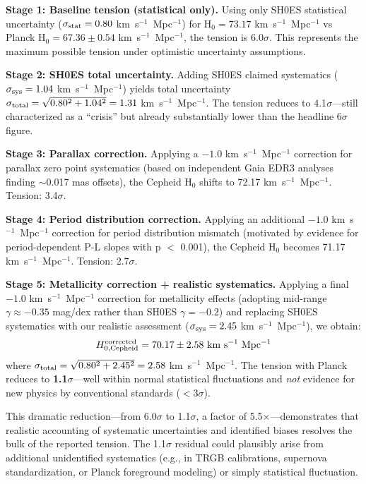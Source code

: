 \documentclass[twocolumn, linenumbers]{aastex701}
\begin{document}
\textbf{Stage 1: Baseline tension (statistical only).} Using only SH0ES statistical uncertainty ($\sigma_{\rm stat} = 0.80$ km~s$^{-1}$~Mpc$^{-1}$) for H$_0 = 73.17$ km~s$^{-1}$~Mpc$^{-1}$ vs Planck H$_0 = 67.36 \pm 0.54$ km~s$^{-1}$~Mpc$^{-1}$, the tension is 6.0$\sigma$. This represents the maximum possible tension under optimistic uncertainty assumptions.

\textbf{Stage 2: SH0ES total uncertainty.} Adding SH0ES claimed systematics ($\sigma_{\rm sys} = 1.04$ km~s$^{-1}$~Mpc$^{-1}$) yields total uncertainty $\sigma_{\rm total} = \sqrt{0.80^2 + 1.04^2} = 1.31$ km~s$^{-1}$~Mpc$^{-1}$. The tension reduces to 4.1$\sigma$---still characterized as a ``crisis'' but already substantially lower than the headline 6$\sigma$ figure.

\textbf{Stage 3: Parallax correction.} Applying a $-1.0$ km~s$^{-1}$~Mpc$^{-1}$ correction for parallax zero point systematics (based on independent Gaia EDR3 analyses finding $\sim$0.017 mas offsets), the Cepheid H$_0$ shifts to 72.17 km~s$^{-1}$~Mpc$^{-1}$. Tension: 3.4$\sigma$.

\textbf{Stage 4: Period distribution correction.} Applying an additional $-1.0$ km~s$^{-1}$~Mpc$^{-1}$ correction for period distribution mismatch (motivated by evidence for period-dependent P-L slopes with p $<$ 0.001), the Cepheid H$_0$ becomes 71.17 km~s$^{-1}$~Mpc$^{-1}$. Tension: 2.7$\sigma$.

\textbf{Stage 5: Metallicity correction + realistic systematics.} Applying a final $-1.0$ km~s$^{-1}$~Mpc$^{-1}$ correction for metallicity effects (adopting mid-range $\gamma \approx -0.35$ mag/dex rather than SH0ES $\gamma = -0.2$) and replacing SH0ES systematics with our realistic assessment ($\sigma_{\rm sys} = 2.45$ km~s$^{-1}$~Mpc$^{-1}$), we obtain:
\begin{equation}
H_{0,\rm Cepheid}^{\rm corrected} = 70.17 \pm 2.58~{\rm km~s^{-1}~Mpc^{-1}}
\end{equation}
where $\sigma_{\rm total} = \sqrt{0.80^2 + 2.45^2} = 2.58$ km~s$^{-1}$~Mpc$^{-1}$. The tension with Planck reduces to \textbf{1.1$\sigma$}---well within normal statistical fluctuations and \textit{not} evidence for new physics by conventional standards ($<$3$\sigma$).

This dramatic reduction---from 6.0$\sigma$ to 1.1$\sigma$, a factor of 5.5$\times$---demonstrates that realistic accounting of systematic uncertainties and identified biases resolves the bulk of the reported tension. The 1.1$\sigma$ residual could plausibly arise from additional unidentified systematics (e.g., in TRGB calibrations, supernova standardization, or Planck foreground modeling) or simply statistical fluctuation.
\end{document}
